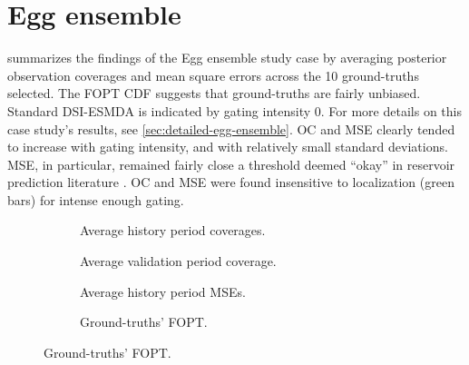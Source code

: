 \section{Egg ensemble}
\label{sec:results-egg}

 summarizes the findings of the Egg ensemble study case 
by averaging posterior observation coverages and mean square errors across the 10 ground-truths selected.
The FOPT CDF suggests that ground-truths are fairly unbiased.
Standard DSI-ESMDA is indicated by gating intensity 0.
For more details on this case study's results, see
\cref{sec:detailed-egg-ensemble}.
%
OC and MSE clearly tended to increase with gating intensity,
and with relatively small standard deviations. 
MSE, in particular, remained fairly close a threshold deemed ``okay'' in reservoir prediction literature
\cite[subsection 9.4.2]{Emerick:2025}.
%
OC and MSE were found insensitive to localization (green bars) for intense enough gating.

\begin{figure}[htbp]
    \caption{%
        Average posterior coverage and MSE values found in the Egg ensemble.
    }
    \label{fig:egg-summaries}
    \begin{subfigure}[b]{.495\linewidth}
        \centering
        \caption{Average history period coverages.}
        
    \end{subfigure}
    \begin{subfigure}[b]{.495\linewidth}
        \centering
        \caption{Average validation period coverage.}
        
    \end{subfigure}
    \begin{subfigure}[b]{.49\linewidth}
        \centering
        \caption{Average history period MSEs.}
        
    \end{subfigure}
    \begin{subfigure}[b]{.49\linewidth}
        \centering
        \caption{Ground-truths' FOPT.}
        \label{fig:fopt-egg}
        
    \end{subfigure}
\end{figure}
